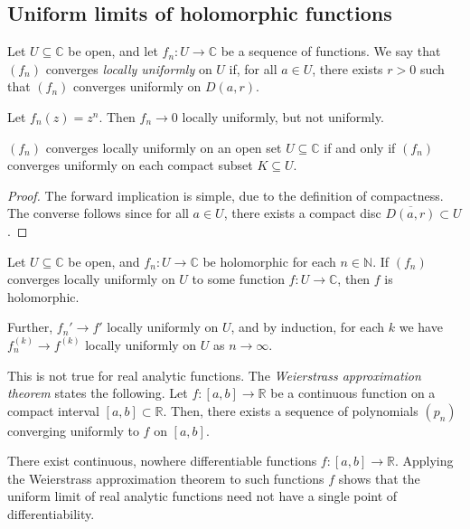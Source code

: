 \subsection{Uniform limits of holomorphic functions}
\begin{definition}
	Let \( U \subseteq \mathbb C \) be open, and let \( f_n \colon U \to \mathbb C \) be a sequence of functions.
	We say that \( (f_n) \) converges \textit{locally uniformly} on \( U \) if, for all \( a \in U \), there exists \( r > 0 \) such that \( (f_n) \) converges uniformly on \( D(a,r) \).
\end{definition}
\begin{example}
	Let \( f_n(z) = z^n \).
	Then \( f_n \to 0 \) locally uniformly, but not uniformly.
\end{example}
\begin{proposition}
	\( (f_n) \) converges locally uniformly on an open set \( U \subseteq \mathbb C \) if and only if \( (f_n) \) converges uniformly on each compact subset \( K \subseteq U \).
\end{proposition}
\begin{proof}
	The forward implication is simple, due to the definition of compactness.
	The converse follows since for all \( a \in U \), there exists a compact disc \( \overline{D(a,r)} \subset U \).
\end{proof}
\begin{theorem}
	Let \( U \subseteq \mathbb C \) be open, and \( f_n \colon U \to \mathbb C \) be holomorphic for each \( n \in \mathbb N \).
	If \( (f_n) \) converges locally uniformly on \( U \) to some function \( f \colon U \to \mathbb C \), then \( f \) is holomorphic.

	Further, \( f_n' \to f' \) locally uniformly on \( U \), and by induction, for each \( k \) we have \( f_n^{(k)} \to f^{(k)} \) locally uniformly on \( U \) as \( n \to \infty \).
\end{theorem}
\begin{remark}
	This is not true for real analytic functions.
	The \textit{Weierstrass approximation theorem} states the following.
	Let \( f \colon [a,b] \to \mathbb R \) be a continuous function on a compact interval \( [a,b] \subset \mathbb R \).
	Then, there exists a sequence of polynomials \( (p_n) \) converging uniformly to \( f \) on \( [a,b] \).

	There exist continuous, nowhere differentiable functions \( f \colon [a,b] \to \mathbb R \).
	Applying the Weierstrass approximation theorem to such functions \( f \) shows that the uniform limit of real analytic functions need not have a single point of differentiability.
\end{remark}
